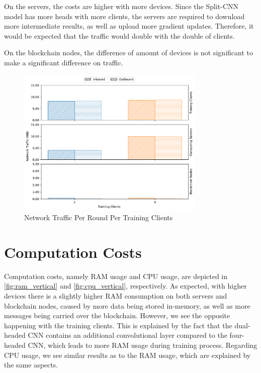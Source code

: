 On the servers, the costs are higher with more devices. Since the Split-CNN model has more heads with more clients, the servers are required to download more intermediate results, as well as upload more gradient updates. Therefore, it would be expected that the traffic would double with the double of clients.

On the blockchain nodes, the difference of amount of devices is not significant to make a significant difference on traffic.

\begin{figure}[!ht]
    \centering
    \centering
    \includegraphics[width=0.8\textwidth]{graphics/vertical/net.pdf}
    \caption{Network Traffic Per Round Per Training Clients}
    \label{fig:net_vertical}
\end{figure}

\section{Computation Costs}

Computation costs, namely RAM usage and CPU usage, are depicted in \autoref{fig:ram_vertical} and \autoref{fig:cpu_vertical}, respectively. As expected, with higher devices there is a slightly higher RAM consumption on both servers and blockchain nodes, caused by more data being stored in-memory, as well as more messages being carried over the blockchain. However, we see the opposite happening with the training clients. This is explained by the fact that the dual-headed CNN contains an additional convolutional layer compared to the four-headed CNN, which leads to more RAM usage during training process. Regarding CPU usage, we see similar results as to the RAM usage, which are explained by the same aspects.

